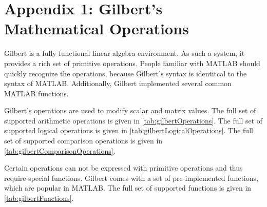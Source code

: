 \chapter{Appendix 1: Gilbert's Mathematical Operations}
\label{appendix:GilbertOps}
\appendix

\captionsetup[table]{list=no}

Gilbert is a fully functional linear algebra environment.
As such a system, it provides a rich set of primitive operations.
People familiar with MATLAB should quickly recognize the operations, because Gilbert's syntax is identitcal to the syntax of MATLAB.
Additionally, Gilbert implemented several common MATLAB functions.

Gilbert's operations are used to modify scalar and matrix values.
The full set of supported arithmetic operations is given in \cref{tab:gilbertOperations}.
The full set of supported logical operations is given in \cref{tab:gilbertLogicalOperations}.
The full set of supported comparison operations is given in \cref{tab:gilbertComparisonOperations}.

Certain operations can not be expressed with primitive operations and thus require special functions.
Gilbert comes with a set of pre-implemented functions, which are popular in MATLAB.
The full set of supported functions is given in \cref{tab:gilbertFunctions}.


